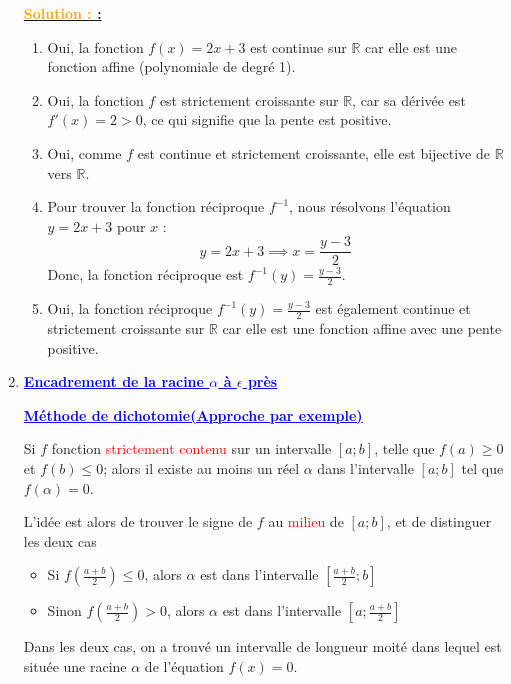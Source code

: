 \documentclass[12pt]{article}
\newcounter{exemple}
\newcounter{solution}
\newcommand{\solution}{%
  \refstepcounter{solution}%
  \textbf{\textcolor{orange}{Solution \thesolution : }} \ignorespaces
}
\begin{document}
\begin{enumerate}[label=\arabic*)]
\textbf{\underline{\solution:}}
\begin{enumerate}
    \item Oui, la fonction \( f(x) = 2x + 3 \) est continue sur \(\mathbb{R}\) car elle est une fonction affine (polynomiale de degré 1).
    \item Oui, la fonction \( f \) est strictement croissante sur \(\mathbb{R}\), car sa dérivée est \( f'(x) = 2 > 0 \), ce qui signifie que la pente est positive.
    \item Oui, comme \( f \) est continue et strictement croissante, elle est bijective de \(\mathbb{R}\) vers \(\mathbb{R}\).
    \item Pour trouver la fonction réciproque \( f^{-1} \), nous résolvons l'équation \( y = 2x + 3 \) pour \( x \) :
    \[
    y = 2x + 3 \implies x = \frac{y - 3}{2}
    \]
    Donc, la fonction réciproque est \( f^{-1}(y) = \frac{y - 3}{2} \).
    \item Oui, la fonction réciproque \( f^{-1}(y) = \frac{y - 3}{2} \) est également continue et strictement croissante sur \(\mathbb{R}\) car elle est une fonction affine avec une pente positive.
\end{enumerate}

\item \textbf{\textcolor{blue}{\underline{Encadrement de la racine \( \alpha \) à \( \epsilon \) près}}}

      \textbf{\textcolor{blue}{\underline{Méthode de dichotomie(Approche par exemple)}}}
      
      Si \( f \) fonction \textcolor{red}{strictement contenu} sur un intervalle \( [a;b] \), telle que \( f(a)\geq 0 \) et \( f(b) \leq 0\); alors il existe au moins un réel \( \alpha \) dans  l'intervalle \( [a;b] \) tel que \( f(\alpha) = 0 \).

L'idée est alors de trouver le signe de \( f \) au \textcolor{red}{ milieu } de \( [a;b] \), et de distinguer les deux cas
\begin{itemize}
\item Si \( f\left( \frac{a+b}{2}\right) \leq 0  \), alors \( \alpha \) est dans l'intervalle 
\( \left[\frac{a+b}{2} ; b \right] \)
\item Sinon \( f\left( \frac{a+b}{2}\right) > 0  \), alors \( \alpha \) est dans l'intervalle 
\( \left[a ; \frac{a+b}{2} \right] \)
\end{itemize}
Dans les deux cas, on a trouvé un intervalle de longueur moité dans lequel est située une racine \( \alpha \) de l'équation \( f(x)=0 \).


\end{enumerate}
\end{document}
